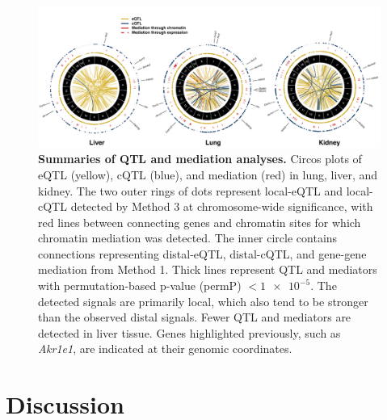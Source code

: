 \documentclass[9pt,twocolumn,twoside]{gsajnl}
\begin{document}
\begin{figure}[h!]
\renewcommand{\familydefault}{\sfdefault}\normalfont
\centering
\includegraphics[width=\textwidth, trim={0in 0in 0in 0in}, clip]{figs/circos_over_tissues.pdf}
\caption{\textbf{Summaries of QTL and mediation analyses.} Circos plots of eQTL (yellow), cQTL (blue), and mediation (red) in lung, liver, and kidney. The two outer rings of dots represent local-eQTL and local-cQTL detected by Method 3 at chromosome-wide significance, with red lines between connecting genes and chromatin sites for which chromatin mediation was detected. The inner circle contains connections representing distal-eQTL, distal-cQTL, and gene-gene mediation from Method 1. Thick lines represent QTL and mediators with permutation-based p-value (permP) $< \num{1e-5}$. The detected signals are primarily local, which also tend to be stronger than the observed distal signals. Fewer QTL and mediators are detected in liver tissue. 
Genes highlighted previously, such as \textit{Akr1e1}, are indicated at their genomic coordinates.
\label{fig:circos_plot}}
\end{figure}

\section{Discussion}
\end{document}

